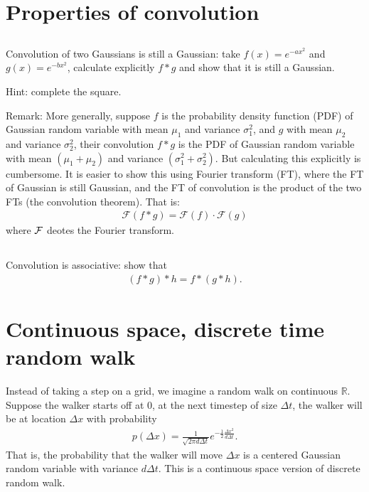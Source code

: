 \documentclass[11pt,letterpaper]{article}
\begin{document}
\section{Properties of convolution}\label{sec:p1}
\subsection{}
Convolution of two Gaussians is still a Gaussian: take $f(x) = e^{-ax^2}$ and $g(x) = e^{-bx^2}$, calculate explicitly $f*g$ and show that it is still a Gaussian.

Hint: complete the square.

Remark: More generally, suppose $f$ is the probability density function (PDF) of Gaussian random variable with mean $\mu_1$ and variance $\sigma_1^2$, and $g$ with mean $\mu_2$ and variance $\sigma_2^2$, their convolution $f*g$ is the PDF of Gaussian random variable with mean $(\mu_1+\mu_2)$ and variance $(\sigma_1^2+\sigma_2^2)$. But calculating this explicitly is cumbersome. It is easier to show this using Fourier transform (FT), where the FT of Gaussian is still Gaussian, and the FT of convolution is the product of the two FTs (the convolution theorem). That is:
\begin{align}
    \mathcal{F}(f*g) = \mathcal{F}(f)\cdot \mathcal{F}(g)
\end{align}
where $\mathcal{F}$ deotes the Fourier transform.

\subsection{}
Convolution is associative: show that
\begin{align}
    (f*g)*h = f*(g*h).
\end{align}

\section{Continuous space, discrete time random walk}
Instead of taking a step on a grid, we imagine a random walk on continuous $\mathbb{R}$. Suppose the walker starts off at $0$, at the next timestep of size $\Delta t$, the walker will be at location $\Delta x$ with probability
\begin{align}
    p(\Delta x) = \frac{1}{ \sqrt{2\pi d\Delta t} } e^{-\frac{1}{2}\frac{\Delta x^2}{d\Delta t}}.
\end{align}
That is, the probability that the walker will move $\Delta x$ is a centered Gaussian random variable with variance $d\Delta t$. This is a continuous space version of discrete random walk.
\end{document}
